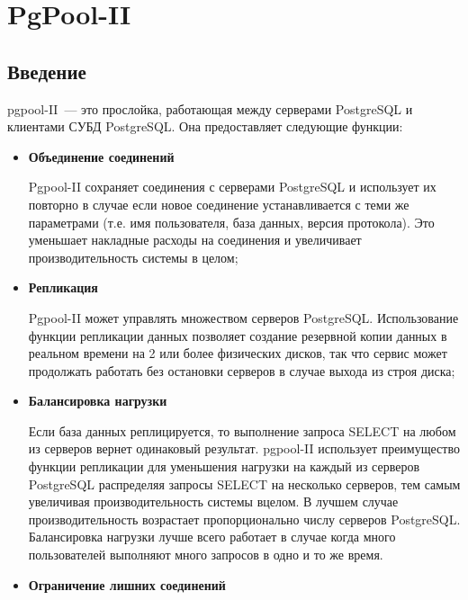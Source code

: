 \chapter{PgPool-II}

\begin{epigraphs}
\end{epigraphs}

\section{Введение}

pgpool-II~--- это прослойка, работающая между серверами PostgreSQL и клиентами СУБД PostgreSQL. Она предоставляет следующие функции:

\begin{itemize}

\item \textbf{Объединение соединений}

Pgpool-II сохраняет соединения с серверами PostgreSQL и использует их повторно в случае если новое соединение устанавливается с теми же параметрами (т.е. имя пользователя, база данных, версия протокола). Это уменьшает накладные расходы на соединения и увеличивает производительность системы в целом;

\item \textbf{Репликация}

Pgpool-II может управлять множеством серверов PostgreSQL. Использование функции репликации данных позволяет создание резервной копии данных в реальном времени на  2 или более физических дисков, так что сервис может продолжать работать без остановки серверов в случае выхода из строя диска;

\item \textbf{Балансировка нагрузки}

Если база данных реплицируется, то выполнение запроса SELECT на любом из серверов вернет одинаковый результат. pgpool-II использует преимущество функции репликации для уменьшения нагрузки на каждый из серверов PostgreSQL распределяя запросы SELECT на несколько серверов, тем самым увеличивая производительность системы вцелом. В лучшем случае производительность возрастает пропорционально числу серверов PostgreSQL. Балансировка нагрузки лучше всего работает в случае когда много пользователей выполняют много запросов в одно и то же время.

\item \textbf{Ограничение лишних соединений}


\end{itemize}
